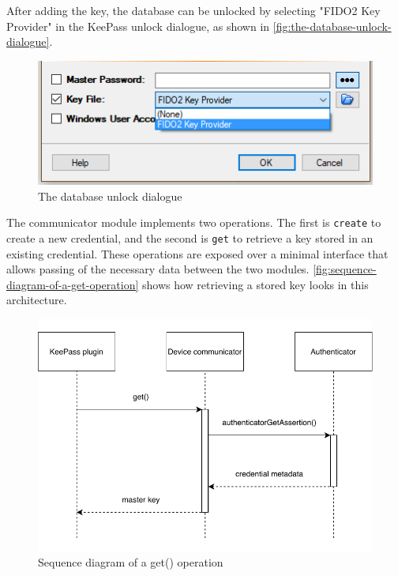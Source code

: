 After adding the key, the database can be unlocked by selecting "FIDO2 Key Provider" in the KeePass
unlock dialogue, as shown in \autoref{fig:the-database-unlock-dialogue}.

\begin{figure}[H]
	\centering\includegraphics[width=.8\textwidth]{images/plugin-unlock}
	\caption{The database unlock dialogue}
	\label{fig:the-database-unlock-dialogue}
\end{figure}

The communicator module implements two operations. The first is \texttt{create} to create a new credential,
and the second is \texttt{get} to retrieve a key stored in an existing credential. These operations are exposed
over a minimal interface that allows passing of the necessary data between the two modules.
\autoref{fig:sequence-diagram-of-a-get-operation} shows how retrieving a stored key looks in this architecture.

\begin{figure}[H]
	\centering\includegraphics[width=\textwidth]{images/plugin-get}
	\caption{Sequence diagram of a get() operation}
	\label{fig:sequence-diagram-of-a-get-operation}
\end{figure}


